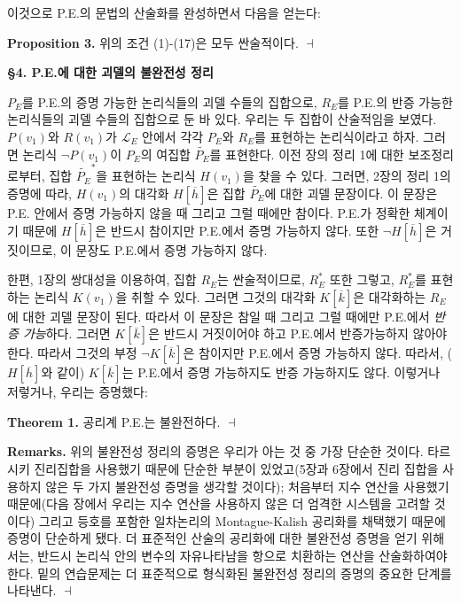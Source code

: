 \documentclass[12pt]{paper}
\newenvironment{context}[1][]
{ \noindent \textbf{{#1}.} }
{ \hfill $ \dashv $ }
\begin{document}
이것으로 P.E.의 문법의 산술화를 완성하면서 다음을 얻는다:

\begin{context}[Proposition 3]
위의 조건 (1)-(17)은 모두 싼술적이다.
\end{context}

\noindent \textbf{\S4. P.E.에 대한 괴델의 불완전성 정리}

$P_E$를 P.E.의 증명 가능한 논리식들의 괴델 수들의 집합으로,
$R_E$를 P.E.의 반증 가능한 논리식들의 괴델 수들의 집합으로 둔 바 있다.
우리는 두 집합이 산술적임을 보였다.
$P \left( v_1 \right)$와 $R \left( v_1 \right)$가 $\mathcal{L}_E$ 안에서
각각 $P_E$와 $R_E$를 표현하는 논리식이라고 하자.
그러면 논리식 $ \lnot P \left( v_1 \right) $이 $P_E$의 여집합 $\widetilde{P_E}$를 표현한다.
이전 장의 정리 1에 대한 보조정리로부터,
집합 $\widetilde{P_{E}}^{*}$을 표현하는 논리식 $H \left( v_1 \right)$을 찾을 수 있다.
그러면, 2장의 정리 1의 증명에 따라,
$H \left( v_1 \right)$의 대각화 $H \left[ \overline{h} \right]$은 집합 $\widetilde{P_E}$에 대한 괴델 문장이다.
이 문장은 P.E. 안에서 증명 가능하지 않을 때 그리고 그럴 때에만 참이다.
P.E.가 정확한 체계이기 때문에 $H \left[ \overline{h} \right]$은 반드시 참이지만 P.E.에서 증명 가능하지 않다.
또한 $ \lnot H \left[ \overline{h} \right] $은 거짓이므로, 이 문장도 P.E.에서 증명 가능하지 않다.

한편, 1장의 쌍대성을 이용하여, 집합 $R_E$는 싼술적이므로, $R_E^*$ 또한 그렇고,
$R_E^*$를 표현하는 논리식 $K \left( v_1 \right)$을 취할 수 있다.
그러면 그것의 대각화 $K \left[ \overline{k} \right]$은 대각화하는 $R_E$에 대한 괴델 문장이 된다.
따라서 이 문장은 참일 때 그리고 그럴 때에만 P.E.에서 \textit{반증 가능}하다.
그러면 $K \left[ \overline{k} \right]$은 반드시 거짓이어야 하고 P.E.에서 반증가능하지 않아야 한다.
따라서 그것의 부정 $\lnot K \left[ \overline{k} \right]$은 참이지만 P.E.에서 증명 가능하지 않다.
따라서, ($H \left[ \overline{h} \right]$와 같이) $K \left[ \overline{k} \right]$는 P.E.에서 증명 가능하지도 반증 가능하지도 않다.
이렇거나 저렇거나, 우리는 증명했다:

\begin{context}[Theorem 1]
공리계 P.E.는 불완전하다.
\end{context}

\begin{context}[Remarks]
위의 불완전성 정리의 증명은 우리가 아는 것 중 가장 단순한 것이다.
타르시키 진리집합을 사용했기 때문에 단순한 부분이 있었고(5장과 6장에서 진리 집합을 사용하지 않은 두 가지 불완전성 증명을 생각할 것이다);
처음부터 지수 연산을 사용했기 때문에(다음 장에서 우리는 지수 연산을 사용하지 않은 더 엄격한 시스템을 고려할 것이다)
그리고 등호를 포함한 일차논리의 Montague-Kalish 공리화를 채택했기 때문에 증명이 단순하게 됐다.
더 표준적인 산술의 공리화에 대한 불완전성 증명을 얻기 위해서는,
반드시 논리식 안의 변수의 자유나타남을 항으로 치환하는 연산을 산술화하여야 한다.
밑의 연습문제는 더 표준적으로 형식화된 불완전성 정리의 증명의 중요한 단계를 나타낸다.
\end{context}
\end{document}
